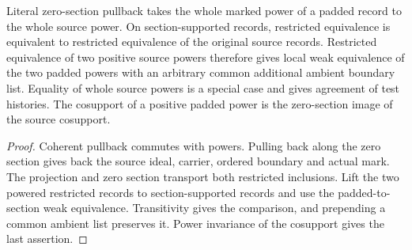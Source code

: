 \begin{theorem}
\label{hir:g1-fixed-normal-chart-powers}
\leanok
Literal zero-section pullback takes the whole marked power of a
padded record to the whole source power. On section-supported
records, restricted equivalence is equivalent to restricted
equivalence of the original source records. Restricted equivalence
of two positive source powers therefore gives local weak equivalence
of the two padded powers with an arbitrary common additional
ambient boundary list. Equality of whole source powers is a special
case and gives agreement of test histories. The cosupport of a
positive padded power is the zero-section image of the source
cosupport.
\end{theorem}
\begin{proof}
Coherent pullback commutes with powers. Pulling back along the zero
section gives back the source ideal, carrier, ordered boundary and
actual mark. The projection and zero section transport both
restricted inclusions. Lift the two powered restricted records to
section-supported records and use the padded-to-section weak
equivalence. Transitivity gives the comparison, and prepending a
common ambient list preserves it. Power invariance of the cosupport
gives the last assertion.
\end{proof}

